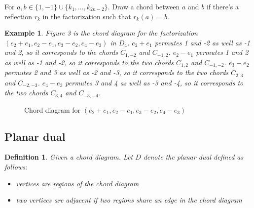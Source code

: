 \documentclass[11pt]{amsart}
\newtheorem{defi}[thm]{Definition}%
\newtheorem{exa}[thm]{Example}%
\begin{document}
For $a,b \in \{1, -1\} \cup \{k_1,\dots,k_{2n-2}\}$. Draw a chord between $a$ and $b$ if there's a reflection $r_k$ in the factorization such that $r_k(a)=b$. 

\begin{exa}
    Figure 3 is the chord diagram for the factorization $(e_2+e_1,e_2-e_1,e_3-e_2,e_4-e_3)$ in $D_4$. $e_2+e_1$ permutes 1 and -2 as well as -1 and 2, so it corresponds to the chords $C_{1,-2}$ and $C_{-1,2}$. $e_2-e_1$ permutes 1 and 2 as well as -1 and -2, so it corresponds to the two chords $C_{1,2}$ and $C_{-1,-2}$. $e_3-e_2$ permutes 2 and 3 as well as -2 and -3, so it corresponds to the two chords $C_{2,3}$ and $C_{-2,-3}$. $e_4-e_3$ permutes 3 and 4 as well as -3 and -4, so it corresponds to the two chords $C_{3,4}$ and $C_{-3,-4}$.
\end{exa}

\begin{figure}
    \centering
    \caption{Chord diagram for $(e_2+e_1,e_2-e_1,e_3-e_2,e_4-e_3)$}
\end{figure}

\subsection{Planar dual}
\begin{defi}
    Given a chord diagram. Let $D$ denote the planar dual defined as follows:
    \begin{itemize}
        \item vertices are regions of the chord diagram
        \item two vertices are adjacent if two regions share an edge in the chord diagram
    \end{itemize}
\end{defi}
\end{document}
